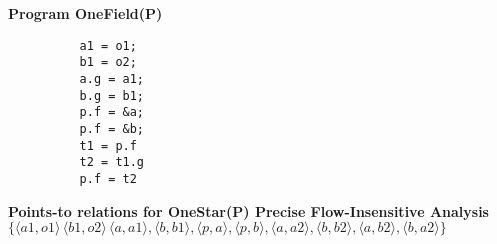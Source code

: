 \documentclass[12pt]{article}
\begin{document}
\begin{enumerate}
\begin{mdframed}
        \textbf{Program OneField(P)}
        \begin{lstlisting}
          a1 = o1;
          b1 = o2;
          a.g = a1;
          b.g = b1;
          p.f = &a;
          p.f = &b;
          t1 = p.f
          t2 = t1.g
          p.f = t2
        \end{lstlisting}

                \textbf{Points-to relations for OneStar(P) Precise Flow-Insensitive Analysis}
        $\{\langle a1, o1 \rangle\, \langle b1, o2 \rangle\, \langle a, a1 \rangle, \langle b, b1 \rangle, \langle p, a \rangle, \langle p, b \rangle, \langle a, a2 \rangle, \langle b, b2 \rangle, \langle a, b2 \rangle, \langle b, a2 \rangle \}$

    
  \end{mdframed}

\end{enumerate}
    
\end{document}
